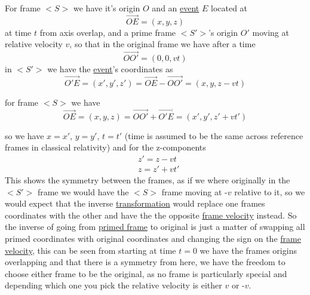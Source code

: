 For frame $<S>$ we have it's origin $O$ and an \hyperlink{def-event}{event} $E$ located at
\begin{equation}%
    \overrightarrow{OE}=(x,y,z)
\end{equation}%
at time $t$ from axis overlap, and a prime frame $<S'>$'s origin $O'$ moving at relative velocity $v$, so that in the original frame we have after a time 
\begin{equation}%
    \overrightarrow{OO'}=(0,0,vt)
\end{equation}%
in $<S'>$ we have the \hyperlink{def-event}{event}'s coordinates as 
\begin{equation}%
    \overrightarrow{O'E} = (x',y',z') = \overrightarrow{OE} - \overrightarrow{OO'}  = (x,y,z-vt)
\label{eq: classical event}
\end{equation}%

for frame $<S>$ we have 
\begin{equation}%
    \overrightarrow{OE} = (x,y,z) = \overrightarrow{OO'} + \overrightarrow{O'E} = (x',y',z'+vt')
\label{eq: classical event 2}
\end{equation}%

so we have $x=x'$, $y=y'$, $t=t'$ (time is assumed to be the same across reference frames in classical relativity) and for the z-components
\begin{equation}%
    \begin{aligned}
      &  z' = z - vt \\
       & z = z'+vt'
    \end{aligned}
\end{equation}%
This shows the symmetry between the frames, as if we where originally in the $<S'>$ frame we would have the $<S>$ frame moving at -$v$ relative to it, so we would expect that the inverse \hyperlink{def-transform}{transformation} would replace one frames coordinates with the other and have the the opposite \hyperlink{def-frame-velocity}{frame velocity} instead.
So the inverse of going from \hyperlink{def-Primed-Frame}{primed frame} to original is just a matter of swapping all primed coordinates with original coordinates and changing the sign on the \hyperlink{def-frame-velocity}{frame velocity}, this can be seen from starting at time $t=0$ we have the frames origins overlapping and that there is a symmetry from here, we have the freedom to choose either frame to be the original, as no frame is particularly special and depending which one you pick the relative velocity is either $v$ or -$v$.

